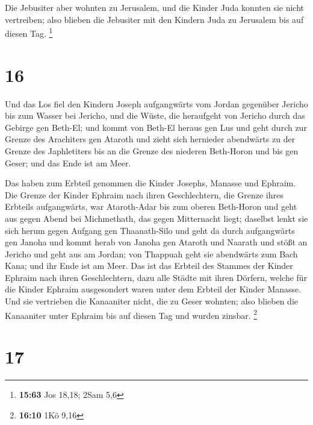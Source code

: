  Die Jebusiter aber wohnten zu Jerusalem, und die Kinder
Juda konnten sie nicht vertreiben; also blieben die Jebusiter mit den
Kindern Juda zu Jerusalem bis auf diesen Tag. \footnote{\textbf{15:63}
  Jos 18,18; 2Sam 5,6}

\hypertarget{section-7}{%
\section{16}\label{section-7}}

 Und das Los fiel den Kindern Joseph aufgangwärts vom Jordan
gegenüber Jericho bis zum Wasser bei Jericho, und die Wüste, die
heraufgeht von Jericho durch das Gebirge gen Beth-El;  und
kommt von Beth-El heraus gen Lus und geht durch zur Grenze des
Arachiters gen Ataroth  und zieht sich hernieder abendwärts
zu der Grenze des Japhletiters bis an die Grenze des niederen Beth-Horon
und bis gen Geser; und das Ende ist am Meer.

 Das haben zum Erbteil genommen die Kinder Josephs, Manasse
und Ephraim.  Die Grenze der Kinder Ephraim nach ihren
Geschlechtern, die Grenze ihres Erbteils aufgangwärts, war Ataroth-Adar
bis zum oberen Beth-Horon  und geht aus gegen Abend bei
Michmethath, das gegen Mitternacht liegt; daselbst lenkt sie sich herum
gegen Aufgang gen Thaanath-Silo und geht da durch aufgangwärts gen
Janoha  und kommt herab von Janoha gen Ataroth und Naarath
und stößt an Jericho und geht aus am Jordan;  von Thappuah
geht sie abendwärts zum Bach Kana; und ihr Ende ist am Meer. Das ist das
Erbteil des Stammes der Kinder Ephraim nach ihren Geschlechtern,
 dazu alle Städte mit ihren Dörfern, welche für die Kinder
Ephraim ausgesondert waren unter dem Erbteil der Kinder Manasse.
 Und sie vertrieben die Kanaaniter nicht, die zu Geser
wohnten; also blieben die Kanaaniter unter Ephraim bis auf diesen Tag
und wurden zinsbar. \footnote{\textbf{16:10} 1Kö 9,16}

\hypertarget{section-8}{%
\section{17}\label{section-8}}

